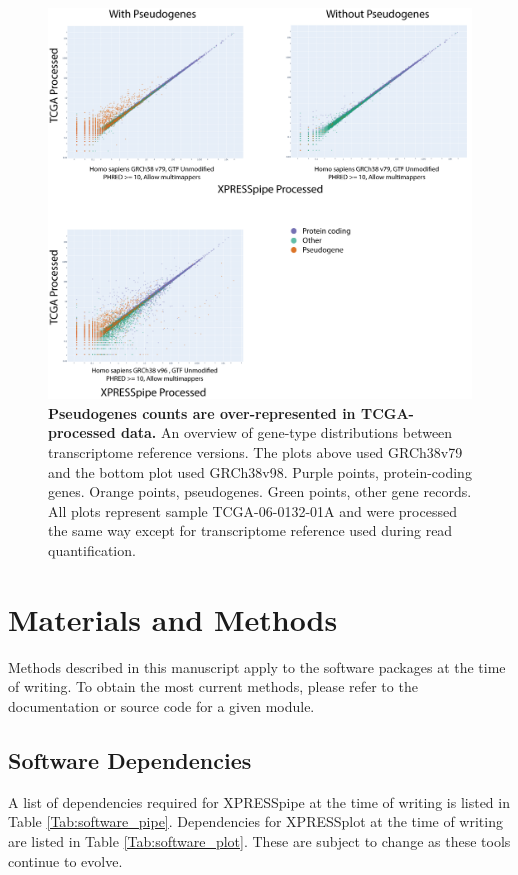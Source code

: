 \documentclass[10pt, oneside]{article}
\begin{document}
\begin{figure}
\centering
  \includegraphics[width=180mm]{figures/xpresspipe_supplement12.png}
  \caption{\textbf{Pseudogenes counts are over-represented in TCGA-processed data.} An overview of gene-type distributions between transcriptome reference versions. The plots above used GRCh38v79 and the bottom plot used GRCh38v98. Purple points, protein-coding genes. Orange points, pseudogenes. Green points, other gene records. All plots represent sample TCGA-06-0132-01A and were processed the same way except for transcriptome reference used during read quantification.}
  \label{fig:supplement8}
\end{figure}


\clearpage


\pagebreak
\section*{Materials and Methods}
Methods described in this manuscript apply to the software packages at the time of writing. To obtain the most current methods, please refer to the documentation or source code for a given module.\\

\subsection*{Software Dependencies}
A list of dependencies required for XPRESSpipe at the time of writing is listed in Table \ref{Tab:software_pipe}. Dependencies for XPRESSplot at the time of writing are listed in Table \ref{Tab:software_plot}. These are subject to change as these tools continue to evolve.\\
\end{document}
